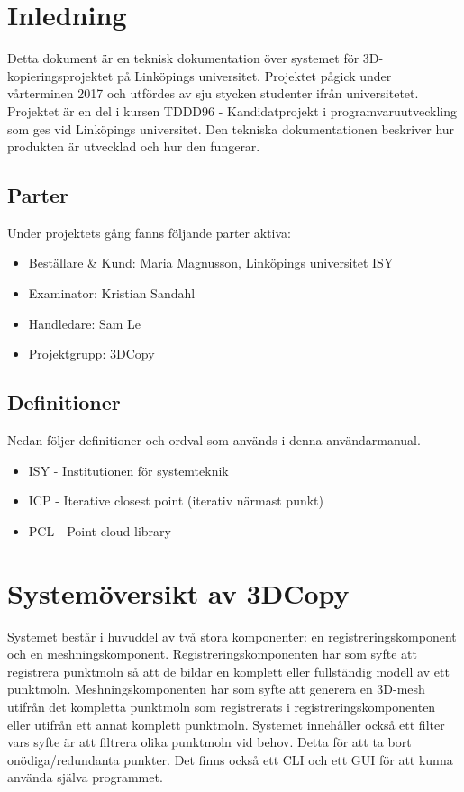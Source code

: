 \documentclass[a4paper,titlepage,12pt]{article}
\begin{document}
\section{Inledning}
	Detta dokument är en teknisk dokumentation över systemet för 3D-kopieringsprojektet på Linköpings universitet. Projektet pågick under vårterminen 2017 och utfördes av sju stycken studenter ifrån universitetet. Projektet är en del i kursen TDDD96 - Kandidatprojekt i programvaruutveckling som ges vid Linköpings universitet. Den tekniska dokumentationen beskriver hur produkten är utvecklad och hur den fungerar.
	\subsection{Parter}
		Under projektets gång fanns följande parter aktiva:
		
		\begin{itemize}
			\item Beställare \& Kund: Maria Magnusson, Linköpings universitet ISY
			\item Examinator: Kristian Sandahl
			\item Handledare: Sam Le
			\item Projektgrupp: 3DCopy
		\end{itemize}
		
	\subsection{Definitioner}
		Nedan följer definitioner och ordval som används i denna användarmanual.
		
		\begin{itemize}
			\item ISY - Institutionen för systemteknik
			\item ICP - Iterative closest point (iterativ närmast punkt)
			\item PCL - Point cloud library
		\end{itemize}
    
\newpage  

\section{Systemöversikt av 3DCopy}
Systemet består i huvuddel av två stora komponenter: en registreringskomponent och en meshningskomponent. Registreringskomponenten har som syfte att registrera punktmoln så att de bildar en komplett eller fullständig modell av ett punktmoln. Meshningskomponenten har som syfte att generera en 3D-mesh utifrån det kompletta punktmoln som registrerats i registreringskomponenten eller utifrån ett annat komplett punktmoln. Systemet innehåller också ett filter vars syfte är att filtrera olika punktmoln vid behov. Detta för att ta bort onödiga/redundanta punkter. Det finns också ett CLI och ett GUI för att kunna använda själva programmet. 
\end{document}
